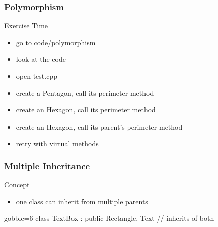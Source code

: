 \begin{frame}[fragile]
  \frametitle{Polymorphism}
  \begin{alertblock}{Exercise Time}
    \begin{itemize}
    \item go to code/polymorphism
    \item look at the code
    \item open test.cpp
    \item create a Pentagon, call its perimeter method
    \item create an Hexagon, call its perimeter method
    \item create an Hexagon, call its parent's perimeter method
    \item retry with virtual methods
    \end{itemize}
  \end{alertblock}
\end{frame}

\begin{frame}[fragile]
  \frametitle{Multiple Inheritance}
  \begin{block}{Concept}
    \begin{itemize}
    \item one class can inherit from multiple parents
    \end{itemize}
  \end{block}
  \begin{multicols}{2}
    \columnbreak
    \vspace{2cm}
    \begin{cppcode*}{gobble=6}
      class TextBox :
        public Rectangle, Text {
        // inherits of both
      }
    \end{cppcode*}
  \end{multicols}
\end{frame}

